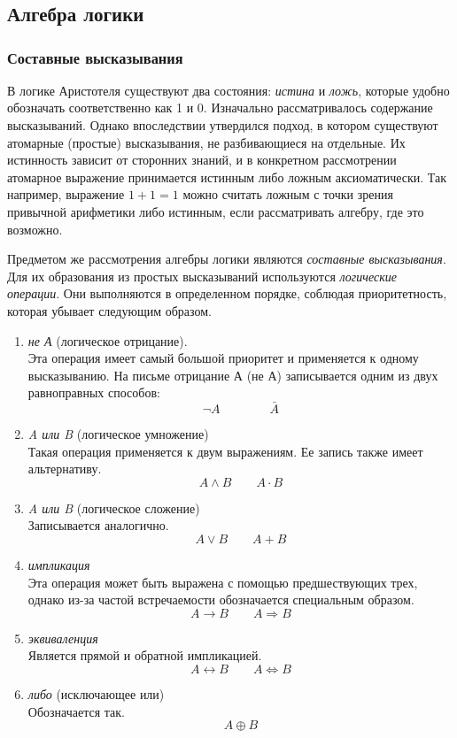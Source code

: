 \chapter{}
\section*{Алгебра логики}
\subsection*{Составные высказывания}

В логике Аристотеля существуют два состояния: \emph{истина} и \emph{ложь}, которые удобно обозначать соответственно как 1 и 0. 
Изначально рассматривалось содержание высказываний. Однако впоследствии утвердился подход, в котором существуют атомарные (простые) высказывания, не разбивающиеся на отдельные. Их истинность зависит от сторонних знаний, и в конкретном рассмотрении атомарное выражение принимается истинным либо ложным аксиоматически. Так например, выражение 
$1+1=1$
можно считать ложным с точки зрения привычной арифметики либо истинным, если рассматривать алгебру, где это возможно. 

Предметом же рассмотрения алгебры логики являются \emph{составные высказывания}. Для их образования из простых высказываний используются \emph{логические операции}. Они выполняются в определенном порядке, соблюдая приоритетность, которая убывает следующим образом.
\begin{enumerate}
	\item \emph{не А} (логическое отрицание). \\
	Эта операция имеет самый большой приоритет и применяется к одному высказыванию. На письме отрицание А (не А) записывается одним из двух равноправных способов:
	\[\neg A \qquad \qquad \bar{A}\]
	\item \emph{A или B} (логическое умножение)\\
	Такая операция применяется к двум выражениям. Ее запись также имеет альтернативу.
	\[A \wedge B \qquad A \cdot B\]
	\item \emph{A или B} (логическое сложение)\\
	Записывается аналогично.
	\[A \vee B \qquad A + B\]
	\item \emph{импликация} \\
	Эта операция может быть выражена с помощью предшествующих трех, однако из-за частой встречаемости обозначается специальным образом.
	\[A \rightarrow B \qquad A \Rightarrow B\]
	\item \emph{эквиваленция}\\
	Является прямой и обратной импликацией. 
	\[A \leftrightarrow B \qquad A \Leftrightarrow B\]
	\item \emph{либо} (исключающее или)\\
	Обозначается так.
	\[A \oplus B\]
	
\end{enumerate}

